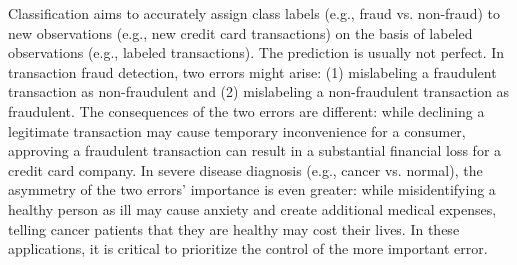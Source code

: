 \documentclass[12pt]{article}
\numberwithin{equation}{section}
\theoremstyle{remark}
\newcommand{\1}{{\rm 1}\kern-0.24em{\rm I}}
\begin{document}

\vspace{-0.05in}

Classification aims to accurately assign class labels (e.g., fraud vs. non-fraud) to new observations (e.g., new credit card transactions) on the basis of labeled observations (e.g., labeled transactions). The prediction is usually not perfect. In transaction fraud detection, two errors might arise: (1) mislabeling a fraudulent transaction as non-fraudulent and (2) mislabeling a non-fraudulent transaction as fraudulent. The consequences of the two errors are different: while declining a legitimate transaction may cause temporary inconvenience for a consumer, approving a fraudulent transaction can result in a substantial financial loss for a credit card company. In severe disease diagnosis (e.g., cancer vs. normal), the asymmetry of the two errors' importance is even greater: while misidentifying a healthy person as ill may cause anxiety and create additional medical expenses, telling cancer patients that they are healthy may cost their lives. In these applications, it is critical to prioritize the control of the more important error.
\end{document}

